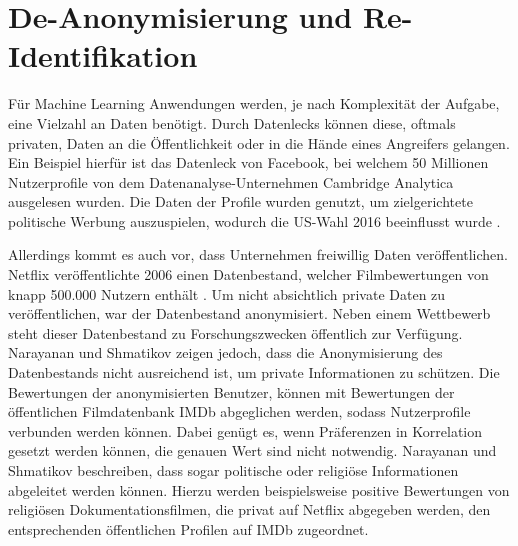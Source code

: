 \section{De-Anonymisierung und Re-Identifikation}\label{sec:deano}

Für Machine Learning Anwendungen werden, je nach Komplexität der Aufgabe, eine Vielzahl an Daten benötigt.
Durch Datenlecks können diese, oftmals privaten, Daten an die Öffentlichkeit oder in die Hände eines Angreifers gelangen.
Ein Beispiel hierfür ist das Datenleck von Facebook, bei welchem 50 Millionen Nutzerprofile von dem Datenanalyse-Unternehmen Cambridge Analytica ausgelesen wurden. 
Die Daten der Profile wurden genutzt, um zielgerichtete politische Werbung auszuspielen, wodurch die US-Wahl 2016 beeinflusst wurde \cite{I-2}.

Allerdings kommt es auch vor, dass Unternehmen freiwillig Daten veröffentlichen. 
Netflix veröffentlichte 2006 einen Datenbestand, welcher Filmbewertungen von knapp 500.000 Nutzern enthält \cite{I-3}. 
Um nicht absichtlich private Daten zu veröffentlichen, war der Datenbestand anonymisiert.
Neben einem Wettbewerb steht dieser Datenbestand zu Forschungszwecken öffentlich zur Verfügung.
Narayanan und Shmatikov \cite{P-29} zeigen jedoch, dass die Anonymisierung des Datenbestands nicht ausreichend ist, um private Informationen zu schützen.
Die Bewertungen der anonymisierten Benutzer, können mit Bewertungen der öffentlichen Filmdatenbank IMDb abgeglichen werden, sodass Nutzerprofile verbunden werden können.
Dabei genügt es, wenn Präferenzen in Korrelation gesetzt werden können, die genauen Wert sind nicht notwendig.
Narayanan und Shmatikov \cite{P-29} beschreiben, dass sogar politische oder religiöse Informationen abgeleitet werden können.
Hierzu werden beispielsweise positive Bewertungen von religiösen Dokumentationsfilmen, die privat auf Netflix abgegeben werden, den entsprechenden öffentlichen Profilen auf IMDb zugeordnet.
